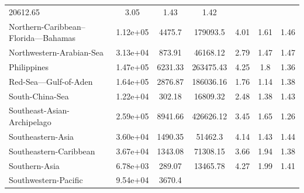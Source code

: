 \begin{table}[H]
{\begin{tabular}{lcccccc}
            20612.65                                   &
            3.05                                       & 1.43     & 1.42
            \\
            Northern-Caribbean--Florida---Bahamas      & 1.12e+05 & 4475.7  &
            179093.5                                   &
            4.01                                       & 1.61     & 1.46
            \\
            Northwestern-Arabian-Sea                   & 3.13e+04 & 873.91  &
            46168.12                                   &
            2.79                                       & 1.47     & 1.47
            \\
            Philippines                                & 1.47e+05 & 6231.33 &
            263475.43                                  &
            4.25                                       & 1.8      & 1.36
            \\
            Red-Sea---Gulf-of-Aden                     & 1.64e+05 & 2876.87 &
            186036.16                                  &
            1.76                                       & 1.14     & 1.38
            \\
            South-China-Sea                            & 1.22e+04 & 302.18  &
            16809.32                                   &
            2.48                                       & 1.38     & 1.43
            \\
            Southeast-Asian-Archipelago                & 2.59e+05 & 8941.66 &
            426626.12                                  &
            3.45                                       & 1.65     & 1.26
            \\
            Southeastern-Asia                          & 3.60e+04 & 1490.35 &
            51462.3                                    &
            4.14                                       & 1.43     & 1.44
            \\
            Southeastern-Caribbean                     & 3.67e+04 & 1343.08 &
            71308.15                                   &
            3.66                                       & 1.94     & 1.38
            \\
            Southern-Asia                              & 6.78e+03 & 289.07  &
            13465.78                                   &
            4.27                                       & 1.99     & 1.41
            \\
            Southwestern-Pacific                       & 9.54e+04 & 3670.4  &

\end{tabular}}
\end{table}
